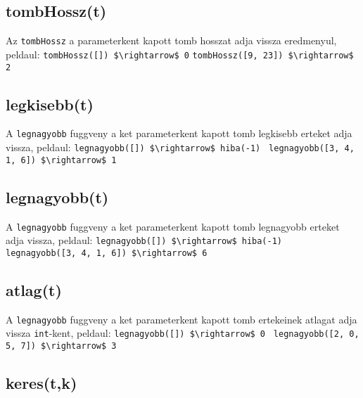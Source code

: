 \documentclass{article}
\begin{document}
\subsection{tombHossz(t)}
Az \lstinline{tombHossz} a parameterkent kapott tomb hosszat adja vissza eredmenyul, peldaul:\newline
\lstinline[mathescape]{tombHossz([]) $\rightarrow$ 0}\newline
\lstinline[mathescape]{tombHossz([9, 23]) $\rightarrow$ 2}\newline

\subsection{legkisebb(t)}

A \lstinline{legnagyobb} fuggveny a ket parameterkent kapott tomb legkisebb erteket adja vissza, peldaul:\newline
\lstinline[mathescape]{legnagyobb([]) $\rightarrow$ hiba(-1) }\newline
\lstinline[mathescape]{legnagyobb([3, 4, 1, 6]) $\rightarrow$ 1 }\newline

\subsection{legnagyobb(t)}

A \lstinline{legnagyobb} fuggveny a ket parameterkent kapott tomb legnagyobb erteket adja vissza, peldaul:\newline
\lstinline[mathescape]{legnagyobb([]) $\rightarrow$ hiba(-1) }\newline
\lstinline[mathescape]{legnagyobb([3, 4, 1, 6]) $\rightarrow$ 6 }\newline

\subsection{atlag(t)}

A \lstinline{legnagyobb} fuggveny a ket parameterkent kapott tomb ertekeinek atlagat adja vissza \lstinline{int}-kent, peldaul:\newline
\lstinline[mathescape]{legnagyobb([]) $\rightarrow$ 0 }\newline
\lstinline[mathescape]{legnagyobb([2, 0, 5, 7]) $\rightarrow$ 3 }\newline

\subsection{keres(t,k)}
\end{document}
